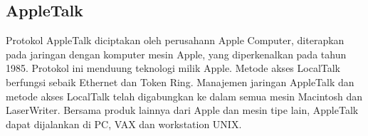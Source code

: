  \subsection{AppleTalk} 
Protokol AppleTalk diciptakan oleh perusahann Apple Computer, diterapkan pada jaringan dengan komputer mesin Apple, yang diperkenalkan 
pada tahun 1985. Protokol ini menduung teknologi milik Apple. Metode akses LocalTalk berfungsi sebaik Ethernet dan Token Ring. Manajemen 
jaringan AppleTalk dan metode akses LocalTalk telah digabungkan ke dalam semua mesin Macintosh dan LaserWriter. Bersama produk lainnya 
dari Apple dan mesin tipe lain, AppleTalk dapat dijalankan di PC, VAX dan workstation UNIX.

